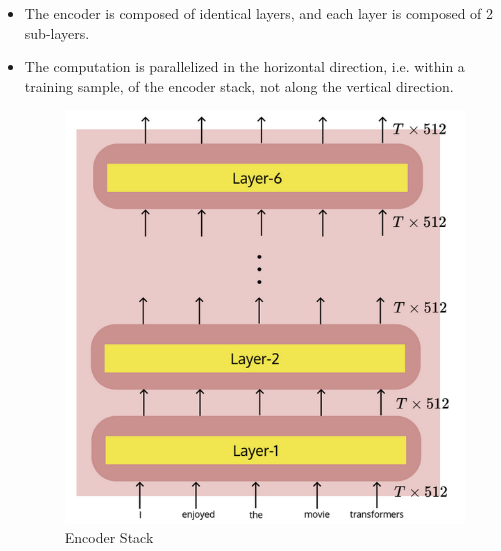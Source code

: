 \documentclass[a4paper]{article}
\begin{document}
\begin{itemize}
    \item The encoder is composed of identical layers, and each layer is composed of 2 sub-layers.
    \item The computation is parallelized in the horizontal direction, i.e. within a training sample, of the encoder stack, not along the vertical direction.
    \begin{figure}[H]
        \centering
        \includegraphics[width=0.5\linewidth]{Degree//static/DL_encoder_stack.png}
        \caption{Encoder Stack}
    \end{figure}
\end{itemize}
\end{document}
